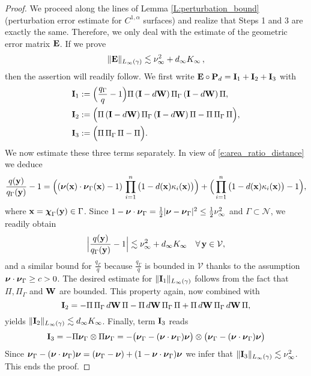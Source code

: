 \begin{proof}
We proceed along the lines of Lemma \ref{L:perturbation_bound}
(perturbation error estimate for $C^{1,\alpha}$ surfaces) and realize that
Steps 1 and 3 are exactly the same. Therefore, we only deal with the estimate of
the geometric error matrix ${\bf E}$. If we prove
%
\begin{equation}\label{est-E}
\|{\bf E} \|_{L_\infty(\gamma)} \lesssim \nu_\infty^2 + d_\infty K_\infty\, ,
\end{equation}
%
then the assertion will readily follow. We first write
${\bf E} \circ {\bf P}_d = {\bf I}_1 + {\bf I}_2 + {\bf I}_3$ with
%
\begin{align*}
{\bf I}_1 & := \Big(\frac{q_\Gamma}{q}-1\Big)
\Pi \, ({\bf I}-d{\bf W}) \, \Pi_\Gamma \, ({\bf I}-d{\bf W}) \, \Pi,
\\
{\bf I}_2 & := \Big(\Pi \, ({\bf I}-d{\bf W}) \, \Pi_\Gamma \, ({\bf I}-d{\bf W}) \, \Pi
- \Pi \, \Pi_\Gamma \, \Pi\Big),
\\
{\bf I}_3 & := \Big(\Pi \, \Pi_\Gamma \, \Pi - \Pi \Big).
\end{align*}
%
We now estimate these three terms separately. In view of \eqref{e:area_ratio_distance}
we deduce
%
\[
\frac{q({\bf y})}{q_\Gamma({\bf y})} -1 = \Big(({\boldsymbol \nu}({\bf x})\cdot{\boldsymbol \nu}_\Gamma({\bf x})-1) \, \prod_{i=1}^n \big(1-d({\bf x})\kappa_i({\bf x}) \big) \Big)
+ \Big(\prod_{i=1}^n \big(1-d({\bf x})\kappa_i({\bf x}) \big) - 1\Big),
\]
where ${\bf x} = {\boldsymbol \chi}_\Gamma({\bf y})\in \Gamma$.
%
Since $1-{\boldsymbol \nu}\cdot{\boldsymbol \nu}_\Gamma = \frac12 |{\boldsymbol \nu}-{\boldsymbol \nu}_\Gamma|^2 \le \frac12 \nu_\infty^2$
and $\Gamma \subset \mathcal N$, we readily obtain
%
\begin{equation}\label{measure_error}
  \Big|\frac{q({\bf y})}{q_\Gamma({\bf y})}-1\Big| \lesssim \nu_\infty^2 + d_\infty K_\infty
  \quad\forall \, {\bf y}\in\mathcal{V},
\end{equation}
%
and a similar bound for $\frac{q_\Gamma}{q}$
because $\frac{q_\Gamma}{q}$ is bounded in $\mathcal{V}$ thanks to the
assumption ${\boldsymbol \nu} \cdot {\boldsymbol \nu}_\Gamma \geq c >0$.
The desired estimate for $\|{\bf I}_1\|_{L_\infty(\gamma)}$ follows from the fact that
$\Pi, \Pi_\Gamma$ and ${\bf W}$ are bounded. This property again, now combined with
%
\[
{\bf I}_2 = - \Pi \, \Pi_\Gamma \, d{\bf W} \, \Pi - \Pi \,d{\bf W} \, \Pi_\Gamma \, \Pi
+ \Pi \,d{\bf W} \, \Pi_\Gamma \,d{\bf W} \, \Pi,
\]
%
yields $\|{\bf I}_2\|_{L_\infty(\gamma)} \lesssim d_\infty K_\infty$. Finally, term ${\bf I}_3$ reads
%
\[
{\bf I}_3 = - \Pi{\boldsymbol \nu}_\Gamma \otimes \Pi{\boldsymbol \nu}_\Gamma =
-\big({\boldsymbol \nu}_\Gamma-({\boldsymbol \nu} \cdot {\boldsymbol \nu}_\Gamma) {\boldsymbol \nu}\big) \otimes
\big({\boldsymbol \nu}_\Gamma- ({\boldsymbol \nu} \cdot {\boldsymbol \nu}_\Gamma) {\boldsymbol \nu} \big)
\]
%
Since ${\boldsymbol \nu}_\Gamma- ({\boldsymbol \nu} \cdot {\boldsymbol \nu}_\Gamma) {\boldsymbol \nu} = ({\boldsymbol \nu}_\Gamma-{\boldsymbol \nu}) + (1-{\boldsymbol \nu}\cdot{\boldsymbol \nu}_\Gamma) {\boldsymbol \nu}$ we infer that $\|{\bf I}_3\|_{L_\infty(\gamma)} \lesssim \nu_\infty^2$.
This ends the proof.
\end{proof} 

